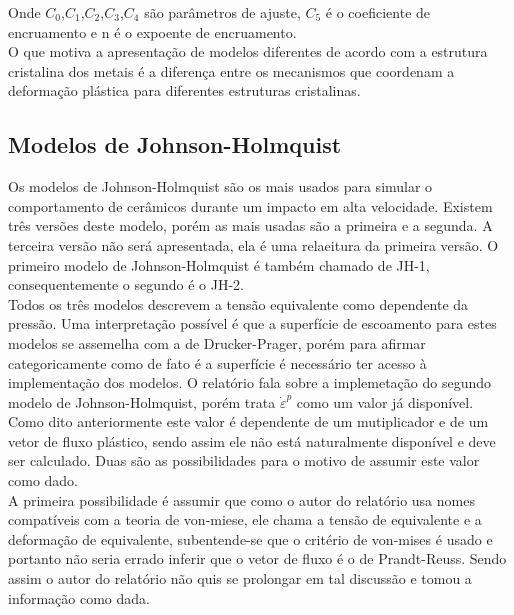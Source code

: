 Onde $C_0$,$C_1$,$C_2$,$C_3$,$C_4$ são parâmetros de ajuste, $ C_5 $ é o coeficiente de encruamento e n é o expoente de encruamento. \\

O que motiva a apresentação de modelos diferentes de acordo com a estrutura cristalina dos metais é a diferença entre os mecanismos que coordenam a deformação plástica para diferentes estruturas cristalinas.
 
 \subsection{Modelos de Johnson-Holmquist}
 
 Os modelos de Johnson-Holmquist são os mais usados para simular o comportamento de cerâmicos durante um impacto em alta velocidade. Existem três versões deste modelo, porém as mais usadas são a primeira e a segunda. A terceira versão não será apresentada, ela é uma relaeitura da primeira versão. O primeiro modelo de Johnson-Holmquist é também chamado de JH-1, consequentemente o segundo é o JH-2.  \\
 
 Todos os três modelos descrevem a tensão equivalente como dependente da pressão. Uma interpretação possível é que a superfície de escoamento para estes modelos se assemelha com a de Drucker-Prager, porém para afirmar categoricamente como de fato é a superfície é necessário ter acesso à implementação dos modelos. O relatório \cite{JH2Imp} fala sobre a implemetação do segundo modelo de Johnson-Holmquist,
 porém trata $ \dot{\varepsilon}^p $ como um valor já disponível. Como dito anteriormente este valor é dependente de um mutiplicador e de um vetor de fluxo plástico, sendo assim ele não está naturalmente disponível e deve ser calculado. Duas são as possibilidades para o motivo de assumir este valor como dado. \\
 
 A primeira possibilidade é assumir que como o autor do relatório usa nomes compatíveis com a teoria de von-miese, ele chama a tensão de equivalente e a deformação de equivalente, subentende-se que o critério de von-mises é usado e portanto não seria errado inferir que o vetor de fluxo é o de Prandt-Reuss. Sendo assim o autor do relatório não quis se prolongar em tal discussão e tomou a informação como dada. \\
 
